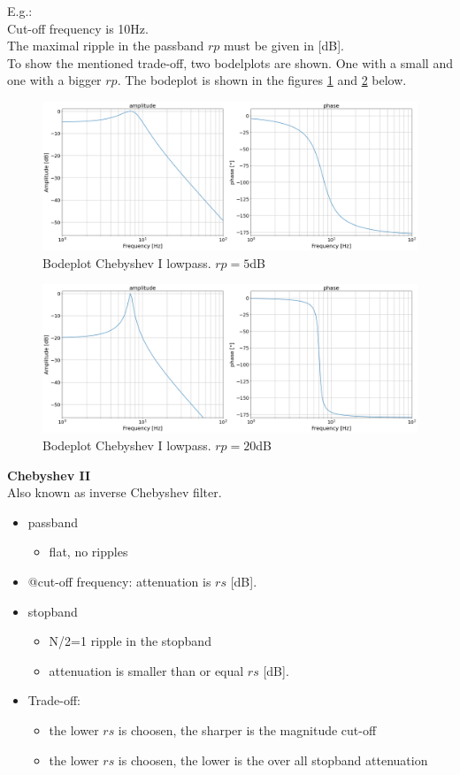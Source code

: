 E.g.: \\
Cut-off frequency is 10Hz.\\
The maximal ripple in the passband $rp$ must be given in [dB].\\
To show the mentioned trade-off, two bodelplots are shown. One with a small and one with a bigger $rp$.
The bodeplot is shown in the figures \ref{fig:lp_cheby1_1} and \ref{fig:lp_cheby1_2} below.
\begin{figure}[h!]
\centering
  \includegraphics[width=0.75\linewidth]{lp_cheby1_5dB.png}
  \caption{Bodeplot Chebyshev I lowpass. $rp=5$dB}
  \label{fig:lp_cheby1_1}
\end{figure}

\begin{figure}[h!]
\centering
  \includegraphics[width=.75\linewidth]{lp_cheby1_20dB.png}
  \caption{Bodeplot Chebyshev I lowpass. $rp=20$dB}
  \label{fig:lp_cheby1_2}
\end{figure}

\textbf{Chebyshev II}\\
Also known as inverse Chebyshev filter.\\
\begin{itemize}
    \item passband
    \begin{itemize}
         \item flat, no ripples 
    \end{itemize}
    \item @cut-off frequency: attenuation is $rs$ [dB].
    \item stopband
    \begin{itemize}
        \item N/2=1 ripple in the stopband
        \item attenuation is smaller than or equal $rs$ [dB].
    \end{itemize}
    \item Trade-off:
    \begin{itemize}
        \item the lower $rs$ is choosen, the sharper is the magnitude cut-off
        \item the lower $rs$ is choosen, the lower is the over all stopband attenuation
    \end{itemize}
\end{itemize}

